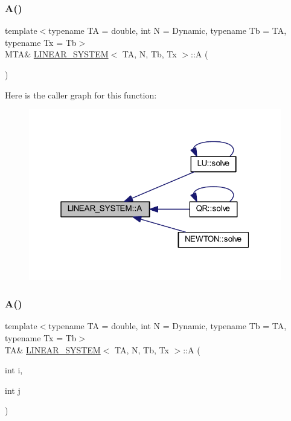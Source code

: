 \subsubsection{\texorpdfstring{A()}{A()}\hspace{0.1cm}{\footnotesize\ttfamily [1/2]}}
{\footnotesize\ttfamily template$<$typename TA = double, int N = Dynamic, typename Tb = TA, typename Tx = Tb$>$ \\
M\+TA\& \mbox{\hyperlink{class_l_i_n_e_a_r___s_y_s_t_e_m}{L\+I\+N\+E\+A\+R\+\_\+\+S\+Y\+S\+T\+EM}}$<$ TA, N, Tb, Tx $>$\+::A (\begin{DoxyParamCaption}{ }\end{DoxyParamCaption})\hspace{0.3cm}{\ttfamily [inline]}}

Here is the caller graph for this function\+:
\nopagebreak
\begin{figure}[H]
\begin{center}
\leavevmode
\includegraphics[width=313pt]{class_l_i_n_e_a_r___s_y_s_t_e_m_a307c8896bb3218768f016a2a24de3bcd_icgraph}
\end{center}
\end{figure}
\mbox{\label{class_l_i_n_e_a_r___s_y_s_t_e_m_a5163aedcb567d591f5812bd3c892fb07}} 
\subsubsection{\texorpdfstring{A()}{A()}\hspace{0.1cm}{\footnotesize\ttfamily [2/2]}}
{\footnotesize\ttfamily template$<$typename TA = double, int N = Dynamic, typename Tb = TA, typename Tx = Tb$>$ \\
TA\& \mbox{\hyperlink{class_l_i_n_e_a_r___s_y_s_t_e_m}{L\+I\+N\+E\+A\+R\+\_\+\+S\+Y\+S\+T\+EM}}$<$ TA, N, Tb, Tx $>$\+::A (\begin{DoxyParamCaption}\item[{int}]{i,  }\item[{int}]{j }\end{DoxyParamCaption})\hspace{0.3cm}{\ttfamily [inline]}}

